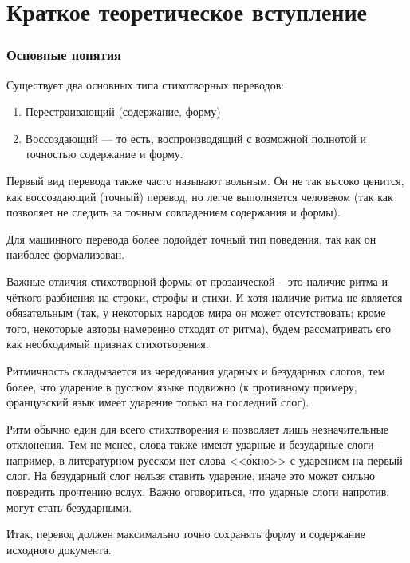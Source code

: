 \chapter{Краткое теоретическое вступление}
\subsection{Основные понятия}
Существует два основных типа стихотворных переводов:

\begin{enumerate}
\item Перестраивающий (содержание, форму)
\item Воссоздающий --- то есть, воспроизводящий с возможной полнотой и точностью содержание и форму.
\end{enumerate}

Первый вид перевода также часто называют вольным. Он не так высоко ценится, как воссоздающий (точный) перевод, но легче выполняется человеком (так как позволяет не следить за точным совпадением содержания и формы).

Для машинного перевода более подойдёт точный тип поведения, так как он наиболее формализован.

Важные отличия стихотворной формы от прозаической -- это наличие ритма и чёткого разбиения на строки, строфы и стихи. И хотя наличие ритма не является обязательным (так, у некоторых народов мира он может отсутствовать; кроме того, некоторые авторы намеренно отходят от ритма), будем рассматривать его как необходимый признак стихотворения.

Ритмичность складывается из чередования ударных и безударных слогов, тем более, что ударение в русском языке подвижно (к противному примеру, французский язык имеет ударение только на последний слог).

Ритм обычно един для всего стихотворения и позволяет лишь незначительные отклонения. Тем не менее, слова также имеют ударные и безударные слоги -- например, в литературном русском нет слова <<\'{о}кно>> с ударением на первый слог. На безударный слог нельзя ставить ударение, иначе это может сильно повредить прочтению вслух. Важно оговориться, что ударные слоги напротив, могут стать безударными.\label{distance}

Итак, перевод должен максимально точно сохранять форму и содержание исходного документа.

\bigskip


